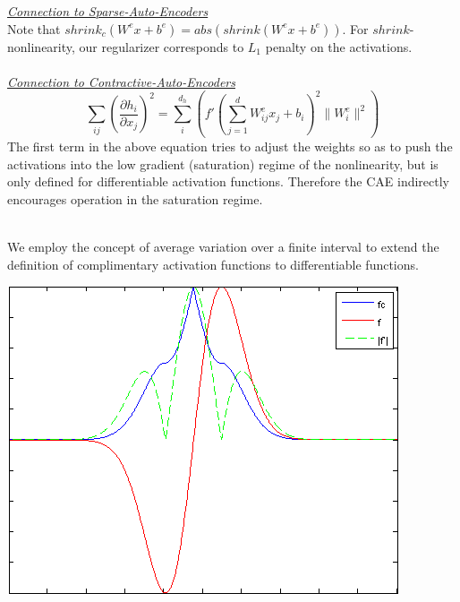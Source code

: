 \documentclass[paperwidth=38in,paperheight=28in,landscape,fontscale=0.4]{baposter}
\begin{document}
\begin{poster}
{}

{

\emph{\uline {Connection to Sparse-Auto-Encoders}} \vspace{2mm} \\ 
Note that $shrink_c(W^e x + b^e) =  abs(shrink(W^e x + b^e))$. For $shrink$-nonlinearity, our regularizer corresponds to $L_1$ penalty on the activations.\\ \\
\emph{\uline {Connection to Contractive-Auto-Encoders}} \\
\begin{equation}
\nonumber
\sum_{ij} \left(\frac{\partial h_i}{\partial x_j} \right)^2 = \sum_i ^{d_h} \left(f'(\sum_{j=1}^d W^e_{ij}x_j + b_i)^2 \| W^e_i \| ^2 \right)
\end{equation}  
The first term in the above equation tries to adjust the weights so as to push the activations into the low gradient (saturation)
regime of the nonlinearity, but is only defined for differentiable activation functions. Therefore the
CAE indirectly encourages operation in the saturation regime. \\ \\
}

{
We employ the concept of average variation over a finite interval to extend the definition of complimentary activation functions to differentiable functions.
\begin{center} \includegraphics[scale=0.4]{diff_cc.png} \end{center} 
}


\end{poster}
\end{document}
